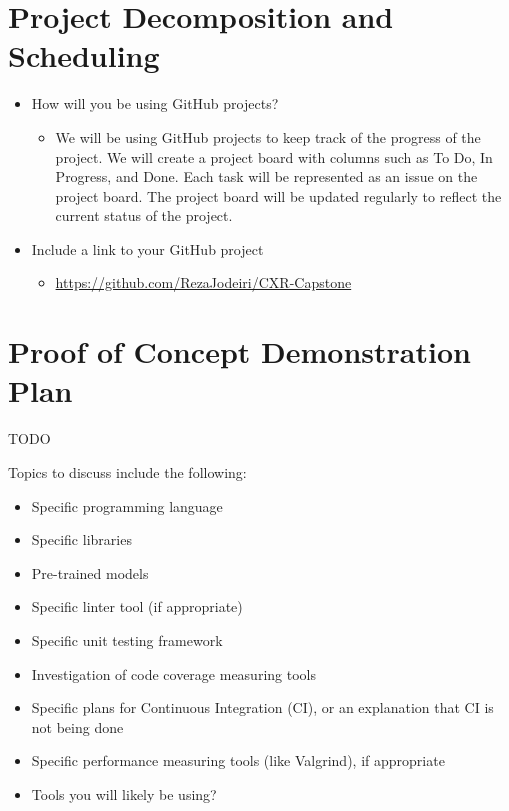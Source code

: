 \documentclass{article}
\begin{document}
\section{Project Decomposition and Scheduling}


\begin{itemize}
    \item How will you be using GitHub projects? 
    
    \begin{itemize}
        \item We will be using GitHub projects to keep track of the progress of the project. We will create a project board with columns such as To Do, In Progress, and Done. Each task will be represented as an issue on the project board. The project board will be updated regularly to reflect the current status of the project.
    \end{itemize}
    \item Include a link to your GitHub project 
    \begin{itemize}
        \item \url{https://github.com/RezaJodeiri/CXR-Capstone}
    \end{itemize}
\end{itemize}



\section{Proof of Concept Demonstration Plan}

TODO


Topics to discuss include the following:

\begin{itemize}
\item Specific programming language
\item Specific libraries
\item Pre-trained models
\item Specific linter tool (if appropriate)
\item Specific unit testing framework
\item Investigation of code coverage measuring tools
\item Specific plans for Continuous Integration (CI), or an explanation that CI
  is not being done
\item Specific performance measuring tools (like Valgrind), if
  appropriate
\item Tools you will likely be using?
\end{itemize}
\end{document}
